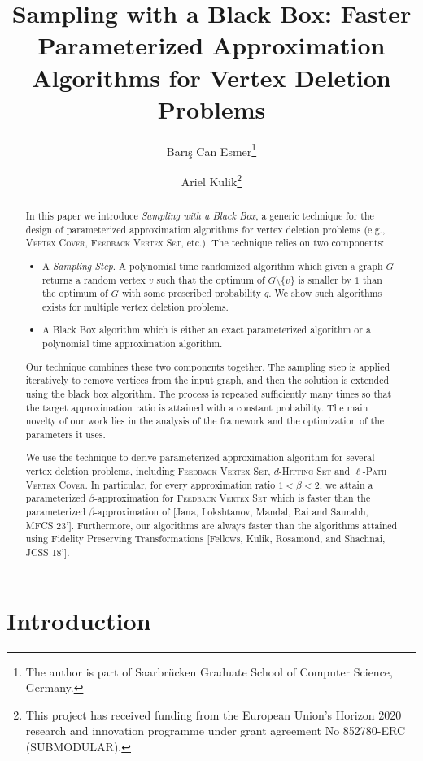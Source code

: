 \documentclass[letterpaper,11pt]{article}
\title{Sampling with a Black Box: Faster Parameterized Approximation Algorithms for Vertex Deletion Problems}
\author[1]{Bar\i\c{s} Can Esmer\thanks{The author is part of Saarbrücken Graduate School of Computer Science, Germany.}}
\author[2]{Ariel Kulik\thanks{This project has received funding from the European Union’s Horizon 2020 research and innovation programme under grant agreement No 852780-ERC (SUBMODULAR).}}
\affil[1]{CISPA Helmholtz Center for Information Security, Saarbr\"ucken, Germany. \texttt{baris-can.esmer@cispa.de}}
\affil[2]{Computer Science Department, Technion, Haifa, Israel. \texttt{kulik@cs.technion.ac.il}}
\date{}
\newcommand{\1}[1]{\mathds{1}\left[#1\right]}
\newcommand{\vc}{\textsc{Vertex Cover}\xspace}
\newcommand{\pathvc}[1]{\ensuremath{#1}\textsc{-Path Vertex Cover}\xspace}
\newcommand{\hs}[1]{\ensuremath{#1}\textsc{-Hitting Set}\xspace}
\newcommand{\fvs}{\textsc{Feedback Vertex Set}\xspace}
\begin{document}
\maketitle

\begin{abstract}
In this paper we introduce {\em Sampling with a Black Box}, a generic technique for the design of parameterized approximation algorithms for vertex deletion problems (e.g., \vc, \fvs, etc.). The technique relies on two components:
\begin{itemize}
	\item A {\em Sampling Step}. A polynomial time randomized algorithm which given a graph $G$ returns a random vertex $v$ such that the optimum of $G\setminus \{v\}$ is smaller by $1$ than the optimum of $G$ with some prescribed probability $q$. We show such algorithms exists for multiple vertex deletion problems.
	 \item A Black Box algorithm which is either an exact parameterized  algorithm or a polynomial time approximation algorithm. 
\end{itemize}
Our technique combines these two components together. The sampling step is applied iteratively to remove vertices from the input graph, and then the solution is extended using the black box algorithm.  The process is repeated sufficiently many times so that the target approximation ratio is attained with a constant probability. The main novelty of our work lies in the analysis of the framework and the optimization of the parameters it uses.    
 
We use the technique to derive parameterized approximation algorithm for several vertex deletion problems, including \fvs, \hs{d} and \pathvc{\ell}. In particular, for every approximation ratio $1<\beta<2$, we attain a parameterized $\beta$-approximation for \fvs which is faster than the parameterized $\beta$-approximation of [Jana,   Lokshtanov,  Mandal, Rai and Saurabh,  MFCS 23']. Furthermore, our algorithms are always faster than the algorithms attained using Fidelity Preserving Transformations [Fellows, Kulik, Rosamond, and Shachnai, JCSS 18'].
 \end{abstract}
\thispagestyle{empty}

\section{Introduction}
\label{sec:introduction}
\end{document}
